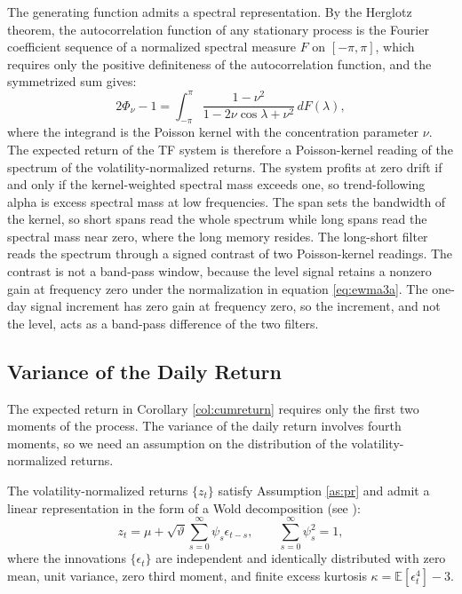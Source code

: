 \documentclass[hidelinks]{siamonline250211}
\begin{document}
The generating function admits a spectral representation. By the Herglotz theorem, the autocorrelation function of any stationary process is the Fourier coefficient sequence of a normalized spectral measure $F$ on $[-\pi, \pi]$, which requires only the positive definiteness of the autocorrelation function, and the symmetrized sum gives:
\begin{equation} \label{eq:sr_spectral}
	2\Phi_{\nu} - 1 = \int^{\pi}_{-\pi} \frac{1-\nu^{2}}{1 - 2\nu\cos\lambda + \nu^{2}}\, dF(\lambda),
\end{equation}
where the integrand is the Poisson kernel with the concentration parameter $\nu$. The expected return of the TF system is therefore a Poisson-kernel reading of the spectrum of the volatility-normalized returns. The system profits at zero drift if and only if the kernel-weighted spectral mass exceeds one, so trend-following alpha is excess spectral mass at low frequencies. The span sets the bandwidth of the kernel, so short spans read the whole spectrum while long spans read the spectral mass near zero, where the long memory resides. The long-short filter reads the spectrum through a signed contrast of two Poisson-kernel readings. The contrast is not a band-pass window, because the level signal retains a nonzero gain at frequency zero under the normalization in equation \eqref{eq:ewma3a}. The one-day signal increment has zero gain at frequency zero, so the increment, and not the level, acts as a band-pass difference of the two filters.


\subsection{Variance of the Daily Return}

The expected return in Corollary \ref{col:cumreturn} requires only the first two moments of the process. The variance of the daily return involves fourth moments, so we need an assumption on the distribution of the volatility-normalized returns.



\begin{assumption}\label{as:lp}
	The volatility-normalized returns $\{z_{t}\}$ satisfy Assumption \ref{as:pr} and admit a linear representation in the form of a Wold decomposition (see \citep[Chapter 4]{Hamilton1994}):
	\begin{equation} \label{eq:sr_lp}
		z_{t} = \mu + \sqrt{\vartheta}\sum^{\infty}_{s=0}\psi_{s}\epsilon_{t-s}, \qquad \sum^{\infty}_{s=0}\psi^{2}_{s}=1,
	\end{equation}
	where the innovations $\{\epsilon_{t}\}$ are independent and identically distributed with zero mean, unit variance, zero third moment, and finite excess kurtosis $\kappa=\mathbb{E}[\epsilon^{4}_{t}]-3$.
\end{assumption}
\end{document}
